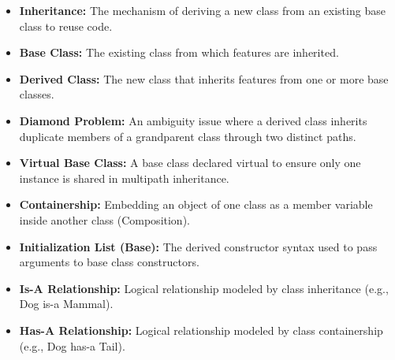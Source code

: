 \documentclass[12pt,a4paper]{article}
\begin{document}
\begin{tcolorbox}[defbox, title={\textbf{One-Line Definitions}}]
\begin{itemize}[leftmargin=*, itemsep=2.5pt, topsep=0pt]
  \item \textbf{Inheritance:} The mechanism of deriving a new class from an existing base class to reuse code.
  \item \textbf{Base Class:} The existing class from which features are inherited.
  \item \textbf{Derived Class:} The new class that inherits features from one or more base classes.
  \item \textbf{Diamond Problem:} An ambiguity issue where a derived class inherits duplicate members of a grandparent class through two distinct paths.
  \item \textbf{Virtual Base Class:} A base class declared virtual to ensure only one instance is shared in multipath inheritance.
  \item \textbf{Containership:} Embedding an object of one class as a member variable inside another class (Composition).
  \item \textbf{Initialization List (Base):} The derived constructor syntax used to pass arguments to base class constructors.
  \item \textbf{Is-A Relationship:} Logical relationship modeled by class inheritance (e.g., Dog is-a Mammal).
  \item \textbf{Has-A Relationship:} Logical relationship modeled by class containership (e.g., Dog has-a Tail).
\end{itemize}
\end{tcolorbox}
\end{document}

